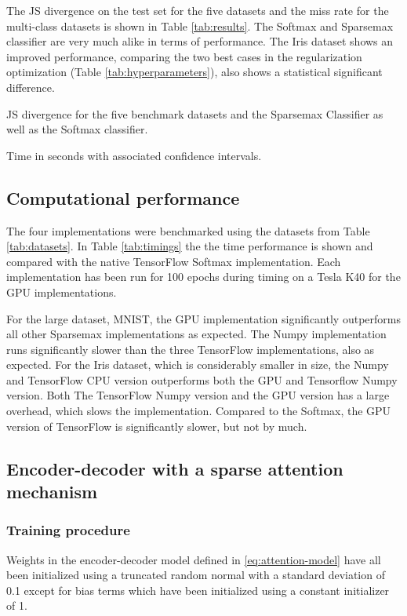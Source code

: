 The JS divergence on the test set for the five datasets and the miss rate for the multi-class datasets is shown in Table \ref{tab:results}. The Softmax and Sparsemax classifier are very much alike in terms of performance. The Iris dataset shows an improved performance, comparing the two best cases in the regularization optimization (Table \ref{tab:hyperparameters}), also shows a statistical significant difference.

\begin{table}[H]
\centering

\caption{JS divergence for the five benchmark datasets and the Sparsemax Classifier as well as the Softmax classifier.}
\label{tab:results}
\end{table}

\begin{table}
\centering

\caption{Time in seconds with associated confidence intervals.}
\label{tab:timings}
\end{table}

\subsection{Computational performance}
The four implementations were benchmarked using the datasets from Table \ref{tab:datasets}. In Table \ref{tab:timings} the the time performance is shown and compared with the native TensorFlow Softmax implementation. Each implementation has been run for 100 epochs during timing on a Tesla K40 for the GPU implementations.

For the large dataset, MNIST, the GPU implementation significantly outperforms all other Sparsemax implementations as expected. The Numpy implementation runs significantly slower than the three TensorFlow implementations, also as expected. For the Iris dataset, which is considerably smaller in size, the Numpy and TensorFlow CPU version outperforms both the GPU and Tensorflow Numpy version. Both The TensorFlow Numpy version and the GPU version has a large overhead, which slows the implementation. Compared to the Softmax, the GPU version of TensorFlow is significantly slower, but not by much.

\subsection{Encoder-decoder with a sparse attention mechanism}
\subsubsection{Training procedure}
Weights in the encoder-decoder model defined in \eqref{eq:attention-model} have all been initialized using a truncated random normal with a standard deviation of 0.1 except for bias terms which have been initialized using a constant initializer of 1. 

